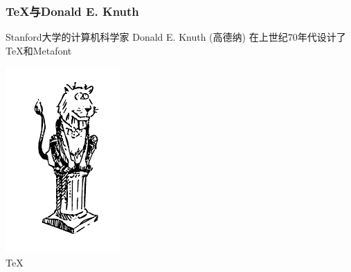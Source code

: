\documentclass[compress]{beamer}
\begin{document}
\begin{frame}
\frametitle{\TeX{}与Donald E. Knuth}
Stanford大学的计算机科学家 Donald E. Knuth (高德纳) 在上世纪70年代设计了\TeX{}和Metafont

\begin{minipage}{0.4\hsize}
\includegraphics[width=0.9\hsize]{tex.pdf}\\
\centering \TeX
\end{minipage}\hfill%
\begin{minipage}{0.4\hsize}

\end{minipage}
\end{frame}
\end{document}

